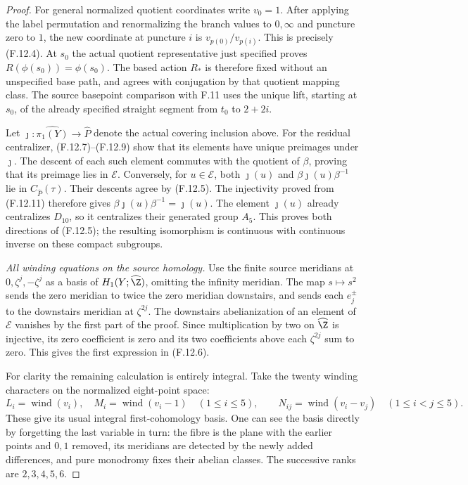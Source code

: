 \begin{proof}
For general normalized quotient coordinates
write $v_0=1$.
After applying the label permutation and
renormalizing the branch values to
$0,\infty$ and puncture zero to $1$,
the new coordinate at puncture $i$ is
$v_{p(0)}/v_{p(i)}$.
This is precisely (F.12.4).
At $s_0$ the actual quotient representative
just specified proves
$R(\phi(s_0))=\phi(s_0)$.
The based action $R_*$ is therefore fixed
without an unspecified base path, and
agrees with conjugation by that quotient
mapping class.
The source basepoint comparison with F.11
uses the unique lift, starting at $s_0$,
of the already specified straight segment
from $t_0$ to $2+2i$.

Let $\jmath:\widehat{\pi_1(Y)}\to\widehat P$
denote the actual covering inclusion above.
For the residual centralizer, (F.12.7)--(F.12.9)
show that its elements have unique preimages
under $\jmath$.
The descent of each such element commutes
with the quotient of $\beta$, proving that
its preimage lies in $\mathcal E$.
Conversely, for $u\in\mathcal E$, both
$\jmath(u)$ and
$\beta\jmath(u)\beta^{-1}$ lie in
$C_{\widehat P}(\tau)$.
Their descents agree by (F.12.5).
The injectivity proved from (F.12.11)
therefore gives
$\beta\jmath(u)\beta^{-1}=\jmath(u)$.
The element $\jmath(u)$ already centralizes
$D_{10}$, so it centralizes their generated
group $A_5$.
This proves both directions of (F.12.5);
the resulting isomorphism is continuous
with continuous inverse on these compact
subgroups.

\emph{All winding equations on the source homology.}
Use the finite source meridians at
$0,\zeta^j,-\zeta^j$ as a basis of
$H_1(Y;\widehat\Z)$, omitting the infinity
meridian.  The map $s\mapsto s^2$ sends
the zero meridian to twice the zero
meridian downstairs, and sends each
$e_j^\pm$ to the downstairs meridian at
$\zeta^{2j}$.
The downstairs abelianization of an element
of $\mathcal E$ vanishes by the first part
of the proof.  Since multiplication by
two on $\widehat\Z$ is injective, its
zero coefficient is zero and its two
coefficients above each $\zeta^{2j}$ sum
to zero.  This gives the first expression
in (F.12.6).

For clarity the remaining calculation is
entirely integral.  Take the twenty winding
characters on the normalized eight-point
space:
\[
 L_i=\operatorname{wind}(v_i),\quad
 M_i=\operatorname{wind}(v_i-1)\quad(1\leq i\leq5),
 \qquad
 N_{ij}=\operatorname{wind}(v_i-v_j)\quad(1\leq i<j\leq5).
                                                               \tag{F.12.14}
\]
These give its usual integral first-cohomology
basis.  One can see the basis directly by
forgetting the last variable in turn: the
fibre is the plane with the earlier points
and $0,1$ removed, its meridians are detected
by the newly added differences, and pure
monodromy fixes their abelian classes.
The successive ranks are $2,3,4,5,6$.


\end{proof}

